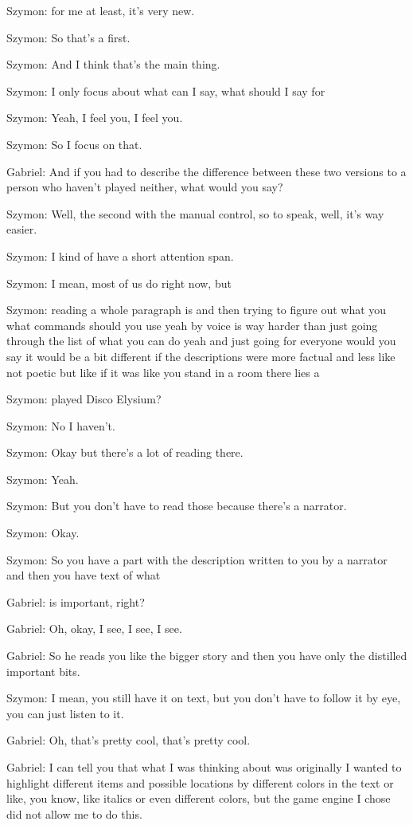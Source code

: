 Szymon: for me at least, it's very new.

Szymon: So that's a first.

Szymon: And I think that's the main thing.

Szymon: I only focus about what can I say, what should I say for

Szymon: Yeah, I feel you, I feel you.

Szymon: So I focus on that.

Gabriel: And if you had to describe the difference between these two versions to a person who haven't played neither, what would you say?

Szymon: Well, the second with the manual control, so to speak, well, it's way easier.

Szymon: I kind of have a short attention span.

Szymon: I mean, most of us do right now, but

Szymon: reading a whole paragraph is and then trying to figure out what you what commands should you use yeah by voice is way harder than just going through the list of what you can do yeah and just going for everyone would you say it would be a bit different if the descriptions were more factual and less like not poetic but like if it was like you stand in a room there lies a

Szymon: played Disco Elysium?

Szymon: No I haven't.

Szymon: Okay but there's a lot of reading there.

Szymon: Yeah.

Szymon: But you don't have to read those because there's a narrator.

Szymon: Okay.

Szymon: So you have a part with the description written to you by a narrator and then you have text of what

Gabriel: is important, right?

Gabriel: Oh, okay, I see, I see, I see.

Gabriel: So he reads you like the bigger story and then you have only the distilled important bits.

Szymon: I mean, you still have it on text, but you don't have to follow it by eye, you can just listen to it.

Gabriel: Oh, that's pretty cool, that's pretty cool.

Gabriel: I can tell you that what I was thinking about was originally I wanted to highlight different items and possible locations by different colors in the text or like, you know, like italics or even different colors, but the game engine I chose did not allow me to do this.

